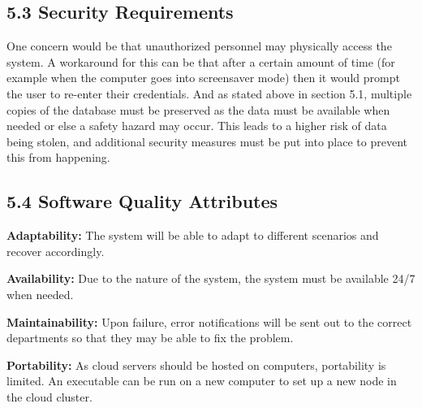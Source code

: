 \documentclass[12pt]{article}
\renewcommand{\_}{\kern-1.5pt\textunderscore\kern-1.5pt}
\begin{document}
\subsection*{5.3 \hspace*{10pt}Security Requirements}
One concern would be that unauthorized personnel may physically access the system. A workaround for this can be that after a certain amount of time (for example when the computer goes into screensaver mode) then it would prompt the user to re-enter their credentials. And as stated above in section 5.1, multiple copies of the database must be preserved as the data must be available when needed or else a safety hazard may occur. This leads to a higher risk of data being stolen, and additional security measures must be put into place to prevent this from happening.\par


\vspace{\baselineskip}
\subsection*{5.4 \hspace*{10pt}Software Quality Attributes}

\vspace{\baselineskip}
\textbf{Adaptability: }The system will be able to adapt to different scenarios and recover accordingly.\par


\vspace{\baselineskip}
\textbf{Availability: }Due to the nature of the system, the system must be available 24/7 when needed.\par


\vspace{\baselineskip}
\textbf{Maintainability: }Upon failure, error notifications will be sent out to the correct departments so that they may be able to fix the problem.\par


\vspace{\baselineskip}
\textbf{Portability: }As cloud servers should be hosted on computers, portability is limited. An executable can be run on a new computer to set up a new node in the cloud cluster. \par
\end{document}
